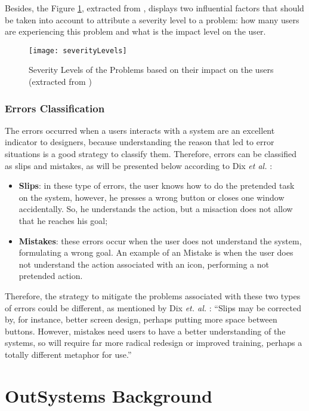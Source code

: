 Besides, the Figure \ref{fig:severityLevels}, extracted from \cite{usabilityEngineering}, displays two influential factors that should be taken into account to attribute a severity level to a problem: how many users are experiencing this problem and what is the impact level on the user.

\begin{figure}[htbp]
	\centering
	\texttt{[image: severityLevels]}
	\caption{Severity Levels of the Problems based on their impact on the users (extracted from \cite{usabilityEngineering})}
	\label{fig:severityLevels}
\end{figure}

\subsubsection{Errors Classification}
\label{subsubsec:errors_classification}
The errors occurred when a users interacts with a system are an excellent indicator to designers, because understanding the reason that led to error situations is a good strategy to classify them. Therefore, errors can be classified as slips and mistakes, as will be presented below according to Dix \textit{et al.} \cite{humanComputerInteraction}:

\begin{itemize}
	\item \textbf{Slips}: in these type of errors, the user knows how to do the pretended task on the system, however, he presses a wrong button or closes one window accidentally. So, he understands the action, but a misaction does not allow that he reaches his goal;
	\item \textbf{Mistakes}: these errors occur when the user does not understand the system, formulating a wrong goal. An example of an Mistake is when the user does not understand the action associated with an icon, performing a not pretended action.
\end{itemize}

Therefore, the strategy to mitigate the problems associated with these two types of errors could be different, as mentioned by Dix \textit{et. al.} \cite{humanComputerInteraction}: “Slips may be corrected by, for instance, better screen design, perhaps putting more space between buttons. However, mistakes need users to have a better understanding of the systems, so will require far more radical redesign or improved training, perhaps a totally different metaphor for use.”


\section{OutSystems Background}
\label{sec:outsystems_background}

